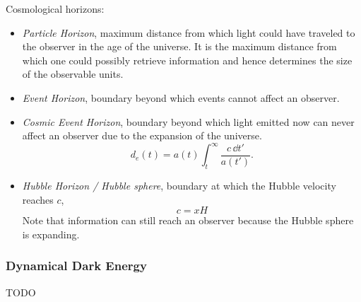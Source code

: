 		\noindent
		Cosmological horizons:
		\begin{itemize}
			\item \emph{Particle Horizon}, maximum distance from which light could have traveled to the observer in the age of the universe. It is the maximum distance from which one could possibly retrieve information and hence determines the size of the observable units.
			\item \emph{Event Horizon}, boundary beyond which events cannot affect an observer.
			\item \emph{Cosmic Event Horizon}, boundary beyond which light emitted now can never affect an observer due to the expansion of the universe.
				\begin{equation}
					d_e(t) = a(t) \int^{\infty}_{t} \frac{c \,\dd t'}{a(t')}.
				\end{equation}
			\item \emph{Hubble Horizon / Hubble sphere}, boundary at which the Hubble velocity reaches $c$,
				\begin{equation}
					c = x H
				\end{equation}
				Note that information can still reach an observer because the Hubble sphere is expanding.
		\end{itemize}


		\subsubsection{Dynamical Dark Energy}
			TODO

